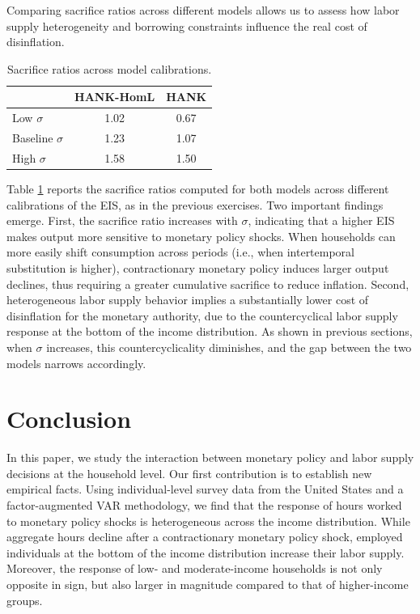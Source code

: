 \documentclass[a4paper,12pt]{article}%
\begin{document}
Comparing sacrifice ratios across different models allows us to assess how labor supply heterogeneity and borrowing constraints influence the real cost of disinflation.

\begin{table}[h!]
\centering
\begin{tabular}{lcc}
\toprule
 & HANK-HomL & HANK \\
\midrule
Low $\sigma$ & 1.02 & 0.67 \\
Baseline $\sigma$ & 1.23 & 1.07 \\
High $\sigma$ & 1.58 & 1.50 \\
\bottomrule
\end{tabular}
\caption{Sacrifice ratios across model calibrations.}
\label{tab:sacrifice_ratios}
\end{table}

Table \ref{tab:sacrifice_ratios} reports the sacrifice ratios computed for both models across different calibrations of the EIS, as in the previous exercises. Two important findings emerge.
First, the sacrifice ratio increases with $\sigma$, indicating that a higher EIS makes output more sensitive to monetary policy shocks. When households can more easily shift consumption across periods (i.e., when intertemporal substitution is higher), contractionary monetary policy induces larger output declines, thus requiring a greater cumulative sacrifice to reduce inflation.
Second, heterogeneous labor supply behavior implies a substantially lower cost of disinflation for the monetary authority, due to the countercyclical labor supply response at the bottom of the income distribution. As shown in previous sections, when $\sigma$ increases, this countercyclicality diminishes, and the gap between the two models narrows accordingly.



\section{Conclusion}\label{T:Conclusion}
In this paper, we study the interaction between monetary policy and labor supply decisions at the household level. Our first contribution is to establish new empirical facts. Using individual-level survey data from the United States and a factor-augmented VAR methodology, we find that the response of hours worked to monetary policy shocks is heterogeneous across the income distribution. While aggregate hours decline after a contractionary monetary policy shock, employed individuals at the bottom of the income distribution increase their labor supply. Moreover, the response of low- and moderate-income households is not only opposite in sign, but also larger in magnitude compared to that of higher-income groups.
\end{document}
